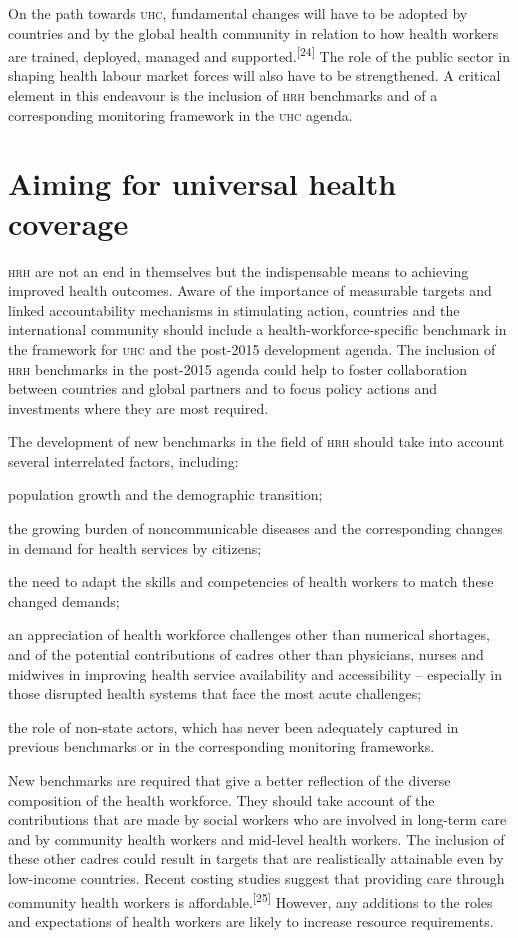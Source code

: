 \documentclass{article}
\begin{document}
On the path towards \textsc{uhc}, fundamental changes will have to be adopted by
countries and by the
global health community in relation to how health workers are trained, deployed,
managed and
supported.\textsuperscript{[}\textsuperscript{24}\textsuperscript{]}
The role of the public sector in
shaping health labour market forces will also have to be strengthened. A
critical element in this
endeavour is the inclusion of \textsc{hrh} benchmarks and of a corresponding monitoring
framework in the \textsc{uhc}
agenda.

\section{Aiming for universal health coverage}

\textsc{hrh} are not an end in themselves but the indispensable means to achieving
improved health
outcomes. Aware of the importance of measurable targets and linked
accountability mechanisms in
stimulating action, countries and the international community should include a
health-workforce-specific benchmark in the framework for \textsc{uhc} and the post-2015
development agenda.
The inclusion of \textsc{hrh} benchmarks in the post-2015 agenda could help to foster
collaboration between
countries and global partners and to focus policy actions and investments where
they are most
required.

The development of new benchmarks in the field of \textsc{hrh} should take into account
several
interrelated factors, including:

population growth and the demographic transition;

the growing burden of noncommunicable diseases and the corresponding changes in
demand for health
services by citizens;

the need to adapt the skills and competencies of health workers to match these
changed
demands;

an appreciation of health workforce challenges other than numerical shortages,
and of the
potential contributions of cadres other than physicians, nurses and midwives in
improving health
service availability and accessibility – especially in those disrupted health
systems that
face the most acute challenges;

the role of non-state actors, which has never been adequately captured in
previous benchmarks or
in the corresponding monitoring frameworks.

New benchmarks are required that give a better reflection of the diverse
composition of the
health workforce. They should take account of the contributions that are made by
social workers who
are involved in long-term care and by community health workers and mid-level
health workers. The
inclusion of these other cadres could result in targets that are realistically
attainable even by
low-income countries. Recent costing studies suggest that providing care through
community health
workers is affordable.\textsuperscript{[}\textsuperscript{25}\textsuperscript{]}
However, any additions to
the roles and expectations of health workers are likely to increase resource
requirements.
\end{document}
